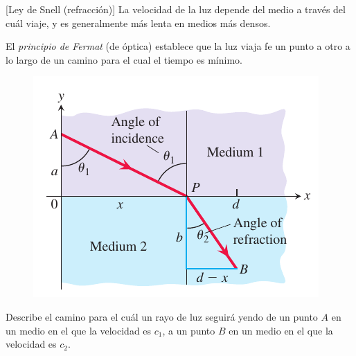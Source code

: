 [Ley de Snell (refracción)]
	La velocidad de la luz depende del medio a través del cuál viaje, y es generalmente más lenta en medios más densos. 
	
	 
	
	El \emph{principio de Fermat} (de óptica) establece que la luz viaja fe un punto a otro a lo largo de un camino para el cual el tiempo es mínimo. 
	



		\begin{figure}
		\centering
		\includegraphics[height=.7\textheight]{./calculo/thomas_04_41}
		\caption{}
		\label{fig:thomas0441}
	\end{figure}
	Describe el camino para el cuál un rayo de luz seguirá yendo de un punto $A$ en un medio en el que la velocidad es $c_1$, a un punto $B$ en un medio en el que la velocidad es $c_2$.



